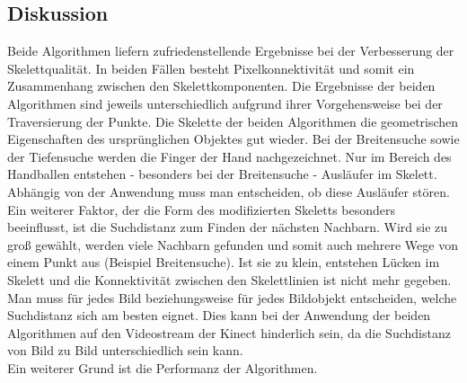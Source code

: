 \subsection{Diskussion}
Beide Algorithmen liefern zufriedenstellende Ergebnisse bei der Verbesserung der Skelettqualität. In beiden
Fällen besteht Pixelkonnektivität und somit ein Zusammenhang zwischen den Skelettkomponenten. Die Ergebnisse
der beiden Algorithmen sind jeweils unterschiedlich aufgrund ihrer Vorgehensweise bei der Traversierung der Punkte. Die Skelette der beiden Algorithmen die geometrischen Eigenschaften des ursprünglichen Objektes gut wieder. Bei der Breitensuche sowie der Tiefensuche werden die Finger der Hand
nachgezeichnet. Nur im Bereich des Handballen entstehen - besonders bei der Breitensuche - Ausläufer im Skelett. Abhängig von der Anwendung muss man entscheiden, ob diese Ausläufer stören.\\
Ein weiterer Faktor, der die Form des modifizierten Skeletts besonders beeinflusst, ist die Suchdistanz zum
Finden der nächsten Nachbarn. Wird sie zu groß gewählt, werden viele Nachbarn gefunden und somit auch
mehrere Wege von einem Punkt aus (Beispiel Breitensuche). Ist sie zu klein, entstehen Lücken im Skelett
und die Konnektivität zwischen den Skelettlinien ist nicht mehr gegeben. Man muss für jedes Bild beziehungsweise für jedes Bildobjekt entscheiden, welche Suchdistanz sich am besten eignet. Dies kann
bei der Anwendung der beiden Algorithmen auf den Videostream der Kinect hinderlich sein, da die Suchdistanz von Bild zu Bild unterschiedlich sein kann. \\
Ein weiterer Grund ist die Performanz der Algorithmen.   